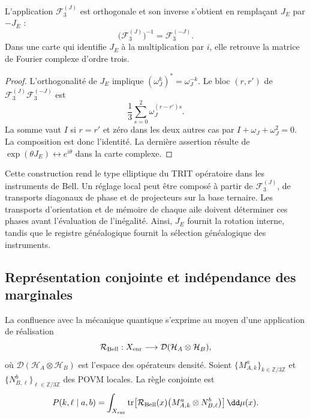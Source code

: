 \begin{proposition}
\label{prop:fourier-triadica-unitaria}
L’application \(\mathcal F_3^{(J)}\) est orthogonale et son inverse s’obtient en remplaçant \(J_E\) par \(-J_E\) :
\[
 \bigl(\mathcal F_3^{(J)}\bigr)^{-1}
 =\mathcal F_3^{(-J)}.
\]
Dans une carte qui identifie \(J_E\) à la multiplication par \(i\), elle retrouve la matrice de Fourier complexe d’ordre trois.
\end{proposition}

\begin{proof}
L’orthogonalité de \(J_E\) implique \((\omega_J^k)^{\!*}=\omega_J^{-k}\). Le bloc \((r,r')\) de \(\mathcal F_3^{(J)}\mathcal F_3^{(-J)}\) est
\[
 \frac13\sum_{s=0}^{2}\omega_J^{(r-r')s}.
\]
La somme vaut \(I\) si \(r=r'\) et zéro dans les deux autres cas par \(I+\omega_J+\omega_J^2=0\). La composition est donc l’identité. La dernière assertion résulte de \(\exp(\theta J_E)\leftrightarrow e^{i\theta}\) dans la carte complexe.
\end{proof}

Cette construction rend le type elliptique du TRIT opératoire dans les instruments de Bell. Un réglage local peut être composé à partir de \(\mathcal F_3^{(J)}\), de transports diagonaux de phase et de projecteurs sur la base ternaire. Les transports d’orientation et de mémoire de chaque aile doivent déterminer ces phases avant l’évaluation de l’inégalité. Ainsi, \(J_E\) fournit la rotation interne, tandis que le registre généalogique fournit la sélection généalogique des instruments.

\subsection{Représentation conjointe et indépendance des marginales}

La confluence avec la mécanique quantique s’exprime au moyen d’une application de réalisation
\begin{equation}
 \mathcal R_{\rm Bell}:X_{\rm enr}\longrightarrow
 \mathcal D(\mathcal H_A\otimes\mathcal H_B),
 \label{eq:realizacion-bell}
\end{equation}
où \(\mathcal D(\mathcal H_A\otimes\mathcal H_B)\) est l’espace des opérateurs densité. Soient \(\{M_{A,k}^{a}\}_{k\in\mathbb Z/3\mathbb Z}\) et \(\{N_{B,\ell}^{b}\}_{\ell\in\mathbb Z/3\mathbb Z}\) des POVM locales. La règle conjointe est
\begin{equation}
 P(k,\ell\mid a,b)
 =\int_{X_{\rm enr}}
  \operatorname{tr}\!\left[
   \mathcal R_{\rm Bell}(x)
   \bigl(M_{A,k}^{a}\otimes N_{B,\ell}^{b}\bigr)
  \right]\dd\mu(x).
 \label{eq:born-bell-hmt}
\end{equation}

